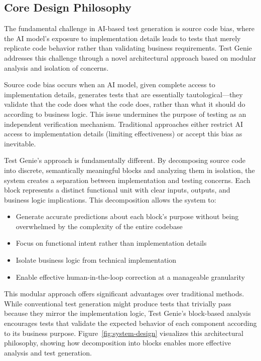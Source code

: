\subsection{Core Design Philosophy}

\hspace{0.5cm}The fundamental challenge in AI-based test generation is source code bias, where the AI model's exposure to implementation details leads to tests that merely replicate code behavior rather than validating business requirements. Test Genie addresses this challenge through a novel architectural approach based on modular analysis and isolation of concerns.

\hspace{0.5cm}Source code bias occurs when an AI model, given complete access to implementation details, generates tests that are essentially tautological—they validate that the code does what the code does, rather than what it should do according to business logic. This issue undermines the purpose of testing as an independent verification mechanism. Traditional approaches either restrict AI access to implementation details (limiting effectiveness) or accept this bias as inevitable.

\hspace{0.5cm}Test Genie's approach is fundamentally different. By decomposing source code into discrete, semantically meaningful blocks and analyzing them in isolation, the system creates a separation between implementation and testing concerns. Each block represents a distinct functional unit with clear inputs, outputs, and business logic implications. This decomposition allows the system to:

\begin{itemize}
    \item Generate accurate predictions about each block's purpose without being overwhelmed by the complexity of the entire codebase
    \item Focus on functional intent rather than implementation details
    \item Isolate business logic from technical implementation
    \item Enable effective human-in-the-loop correction at a manageable granularity
\end{itemize}

\hspace{0.5cm}This modular approach offers significant advantages over traditional methods. While conventional test generation might produce tests that trivially pass because they mirror the implementation logic, Test Genie's block-based analysis encourages tests that validate the expected behavior of each component according to its business purpose. Figure~\ref{fig:system-design} visualizes this architectural philosophy, showing how decomposition into blocks enables more effective analysis and test generation.

